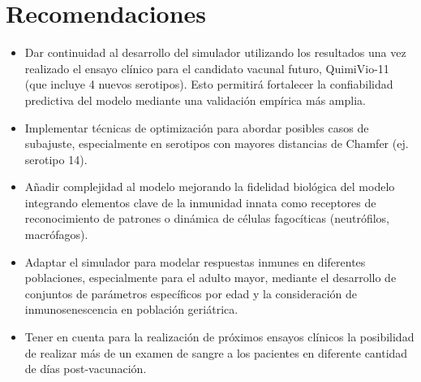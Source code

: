 \chapter*{Recomendaciones}\label{chapter:recomendations}

\begin{itemize}
    \item Dar continuidad al desarrollo del simulador utilizando los resultados una vez realizado el ensayo clínico para el candidato vacunal futuro, QuimiVio-11 (que incluye 4 nuevos serotipos). Esto permitirá fortalecer la confiabilidad predictiva del modelo mediante una validación empírica más amplia.

    \item Implementar técnicas de optimización para abordar posibles casos de subajuste, especialmente en serotipos con mayores distancias de Chamfer (ej. serotipo 14). 


    \item Añadir complejidad al modelo mejorando la fidelidad biológica del modelo integrando elementos clave de la inmunidad innata como receptores de reconocimiento de patrones o dinámica de células fagocíticas (neutrófilos, macrófagos).
    

    \item Adaptar el simulador para modelar respuestas inmunes en diferentes poblaciones, especialmente para el adulto mayor, mediante el desarrollo de conjuntos de parámetros específicos por edad y la consideración de inmunosenescencia en población geriátrica.
    
    \item Tener en cuenta para la realización de próximos ensayos clínicos la posibilidad de realizar más de un examen de sangre a los pacientes en diferente cantidad de días post-vacunación.

\end{itemize}